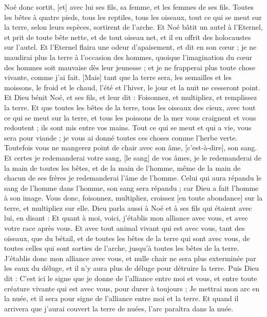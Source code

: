 \begin{multicols}{2}
Noé donc sortit, [et] avec lui ses fils, sa femme, et les femmes de ses fils.
Toutes les bêtes à quatre pieds, tous les reptiles, tous les oiseaux, tout ce qui se meut sur la terre, selon leurs espèces, sortirent de l'arche.
Et Noé bâtit un autel à l'Eternel, et prit de toute bête nette, et de tout oiseau net, et il en offrit des holocaustes sur l'autel.
Et l'Eternel flaira une odeur d'apaisement, et dit en son cœur ; je ne maudirai plus la terre à l'occasion des hommes, quoique l'imagination du cœur des hommes soit mauvaise dès leur jeunesse ; et je ne frapperai plus toute chose vivante, comme j'ai fait.
[Mais] tant que la terre sera, les semailles et les moissons, le froid et le chaud, l'été et l'hiver, le jour et la nuit ne cesseront point.
\VerseOne{}Et Dieu bénit Noé, et ses fils, et leur dit : Foisonnez, et multipliez, et remplissez la terre.
Et que toutes les bêtes de la terre, tous les oiseaux des cieux, avec tout ce qui se meut sur la terre, et tous les poissons de la mer vous craignent et vous redoutent ; ils sont mis entre vos mains.
Tout ce qui se meut et qui a vie, vous sera pour viande ; je vous ai donné toutes ces choses comme l'herbe verte.
Toutefois vous ne mangerez point de chair avec son âme, [c'est-à-dire], son sang.
Et certes je redemanderai votre sang, [le sang] de vos âmes, je le redemanderai de la main de toutes les bêtes, et de la main de l'homme, même de la main de chacun de ses frères je redemanderai l'âme de l'homme.
Celui qui aura répandu le sang de l'homme dans l'homme, son sang sera répandu ; car Dieu a fait l'homme à son image.
Vous donc, foisonnez, multipliez, croissez [en toute abondance] sur la terre, et multipliez sur elle.
Dieu parla aussi à Noé et à ses fils qui étaient avec lui, en disant :
Et quant à moi, voici, j'établis mon alliance avec vous, et avec votre race après vous.
Et avec tout animal vivant qui est avec vous, tant des oiseaux, que du bétail, et de toutes les bêtes de la terre qui sont avec vous, de toutes celles qui sont sorties de l'arche, jusqu'à toutes les bêtes de la terre.
J'établis donc mon alliance avec vous, et nulle chair ne sera plus exterminée par les eaux du déluge, et il n'y aura plus de déluge pour détruire la terre.
Puis Dieu dit : C'est ici le signe que je donne de l'alliance entre moi et vous, et entre toute créature vivante qui est avec vous, pour durer à toujours ;
Je mettrai mon arc en la nuée, et il sera pour signe de l'alliance entre moi et la terre.
Et quand il arrivera que j'aurai couvert la terre de nuées, l'arc paraîtra dans la nuée.

\end{multicols}
